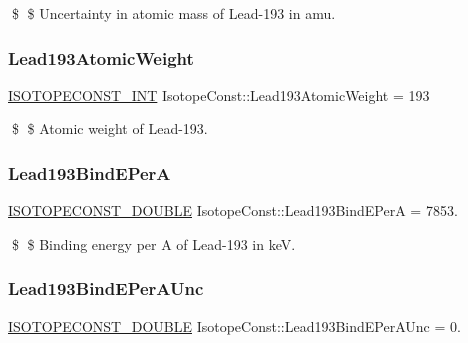 \$ \$ Uncertainty in atomic mass of Lead-\/193 in amu. \mbox{\label{group___isotope_const-_lead-_pb193_ga22546bd9dbbe97f39fd59200c09b936d}} 
\subsubsection{\texorpdfstring{Lead193\+Atomic\+Weight}{Lead193AtomicWeight}}
{\footnotesize\ttfamily \mbox{\hyperlink{group___isotope_const-_macros_ga5f18360b3e99483a35c32d789e62621c}{I\+S\+O\+T\+O\+P\+E\+C\+O\+N\+S\+T\+\_\+\+I\+NT}} Isotope\+Const\+::\+Lead193\+Atomic\+Weight = 193}

\$ \$ Atomic weight of Lead-\/193. \mbox{\label{group___isotope_const-_lead-_pb193_gaa4a8960313495dbea424f377be7fe46d}} 
\subsubsection{\texorpdfstring{Lead193\+Bind\+E\+PerA}{Lead193BindEPerA}}
{\footnotesize\ttfamily \mbox{\hyperlink{group___isotope_const-_macros_ga8f45a7272ce02c0b4c65c44636ed719a}{I\+S\+O\+T\+O\+P\+E\+C\+O\+N\+S\+T\+\_\+\+D\+O\+U\+B\+LE}} Isotope\+Const\+::\+Lead193\+Bind\+E\+PerA = 7853.}

\$ \$ Binding energy per A of Lead-\/193 in keV. \mbox{\label{group___isotope_const-_lead-_pb193_gac4743055586af3b07c5c160fa5af31c9}} 
\subsubsection{\texorpdfstring{Lead193\+Bind\+E\+Per\+A\+Unc}{Lead193BindEPerAUnc}}
{\footnotesize\ttfamily \mbox{\hyperlink{group___isotope_const-_macros_ga8f45a7272ce02c0b4c65c44636ed719a}{I\+S\+O\+T\+O\+P\+E\+C\+O\+N\+S\+T\+\_\+\+D\+O\+U\+B\+LE}} Isotope\+Const\+::\+Lead193\+Bind\+E\+Per\+A\+Unc = 0.}

